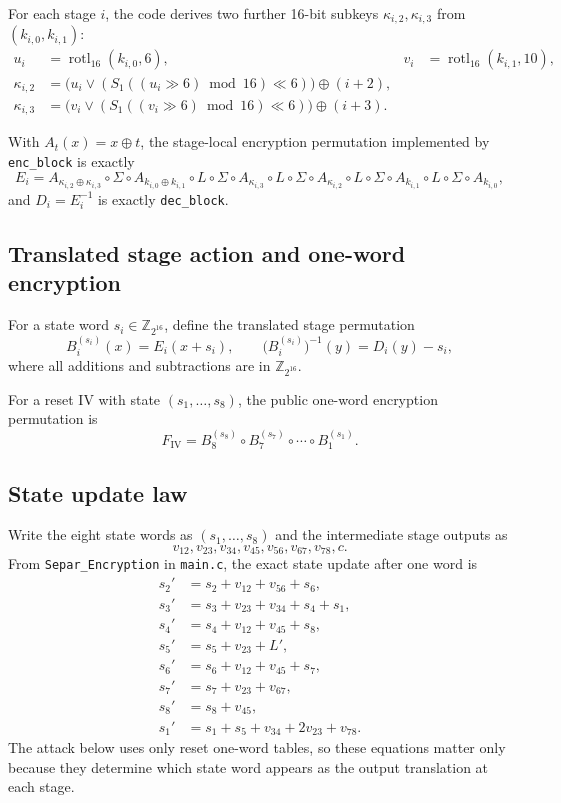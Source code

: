 \documentclass[11pt]{article}
\newcommand{\Z}[1]{\mathbb{Z}_{#1}}
\newcommand{\rot}{\operatorname{rotl}_{16}}
\begin{document}
For each stage $i$, the code derives two further 16-bit subkeys $\kappa_{i,2},\kappa_{i,3}$ from $(k_{i,0},k_{i,1})$:
\begin{align*}
u_i &= \rot(k_{i,0},6), &
v_i &= \rot(k_{i,1},10),\\
\kappa_{i,2} &= \bigl(u_i \vee (S_1((u_i \gg 6)\bmod 16)\ll 6)\bigr)\oplus (i+2),\\
\kappa_{i,3} &= \bigl(v_i \vee (S_1((v_i \gg 6)\bmod 16)\ll 6)\bigr)\oplus (i+3).
\end{align*}

With $A_t(x)=x\oplus t$, the stage-local encryption permutation implemented by \texttt{enc\_block} is exactly
\begin{equation}
\label{eq:stage-enc}
E_i
=
A_{\kappa_{i,2}\oplus \kappa_{i,3}}
\circ \Sigma
\circ A_{k_{i,0}\oplus k_{i,1}}
\circ L
\circ \Sigma
\circ A_{\kappa_{i,3}}
\circ L
\circ \Sigma
\circ A_{\kappa_{i,2}}
\circ L
\circ \Sigma
\circ A_{k_{i,1}}
\circ L
\circ \Sigma
\circ A_{k_{i,0}},
\end{equation}
and $D_i=E_i^{-1}$ is exactly \texttt{dec\_block}.

\subsection{Translated stage action and one-word encryption}
For a state word $s_i\in\Z{2^{16}}$, define the translated stage permutation
\[
B_i^{(s_i)}(x)=E_i(x+s_i),
\qquad
\bigl(B_i^{(s_i)}\bigr)^{-1}(y)=D_i(y)-s_i,
\]
where all additions and subtractions are in $\Z{2^{16}}$.

For a reset IV with state $(s_1,\dots,s_8)$, the public one-word encryption permutation is
\[
F_{\mathrm{IV}}
=
B_8^{(s_8)}
\circ B_7^{(s_7)}
\circ \cdots \circ
B_1^{(s_1)}.
\]

\subsection{State update law}
Write the eight state words as $(s_1,\dots,s_8)$ and the intermediate stage outputs as
\[
v_{12},v_{23},v_{34},v_{45},v_{56},v_{67},v_{78},c.
\]
From \texttt{Separ\_Encryption} in \texttt{main.c}, the exact state update after one word is
\begin{align}
s_2' &= s_2 + v_{12} + v_{56} + s_6, \label{eq:s2}\\
s_3' &= s_3 + v_{23} + v_{34} + s_4 + s_1, \label{eq:s3}\\
s_4' &= s_4 + v_{12} + v_{45} + s_8, \label{eq:s4}\\
s_5' &= s_5 + v_{23} + L', \label{eq:s5}\\
s_6' &= s_6 + v_{12} + v_{45} + s_7, \label{eq:s6}\\
s_7' &= s_7 + v_{23} + v_{67}, \label{eq:s7}\\
s_8' &= s_8 + v_{45}, \label{eq:s8}\\
s_1' &= s_1 + s_5 + v_{34} + 2v_{23} + v_{78}. \label{eq:s1}
\end{align}
The attack below uses only reset one-word tables, so these equations matter only because they determine which state word appears as the output translation at each stage.
\end{document}

